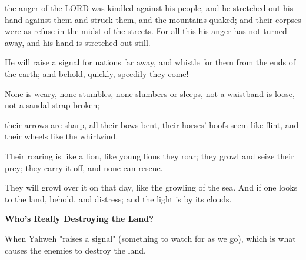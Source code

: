 \documentclass[11pt]{article}
\begin{document}
\begin{biblicaloutline}[Isaiah 5:18-25 (B')]
\begin{versesection}{2em}
          the anger of the LORD was kindled against his people,
        \poetryline and he stretched out his hand against them and struck them,
        \poetryline and the mountains quaked;
        and their corpses were as refuse
        \poetryline in the midst of the streets.
        For all this his anger has not turned away,
        \poetryline and his hand is stretched out still.
    \end{versesection}

\end{biblicaloutline}

\begin{biblicaloutline}[Isaiah 5:26-30 (A')]

    \begin{versesection}{2em}
         He will raise a signal for nations far away,
        \poetryline and whistle for them from the ends of the earth;
        \poetryline and behold, quickly, speedily they come!
        
         None is weary, none stumbles,
        \poetryline none slumbers or sleeps,
        not a waistband is loose,
        \poetryline not a sandal strap broken;
        
         their arrows are sharp,
        \poetryline all their bows bent,
        their horses' hoofs seem like flint,
        \poetryline and their wheels like the whirlwind.
        
         Their roaring is like a lion,
        \poetryline like young lions they roar;
        they growl and seize their prey;
        \poetryline they carry it off, and none can rescue.
        
         They will growl over it on that day,
        \poetryline like the growling of the sea.
        And if one looks to the land,
        \poetryline behold,  and distress;
        and the light is  by its clouds.
    \end{versesection}

\end{biblicaloutline}


\vspace{3em}
{\large\bfseries Who's Really Destroying the Land?}
\vspace{1em}

When Yahweh "raises a signal" (something to watch for as we go), which is what causes the enemies to destroy the land.
\end{document}
